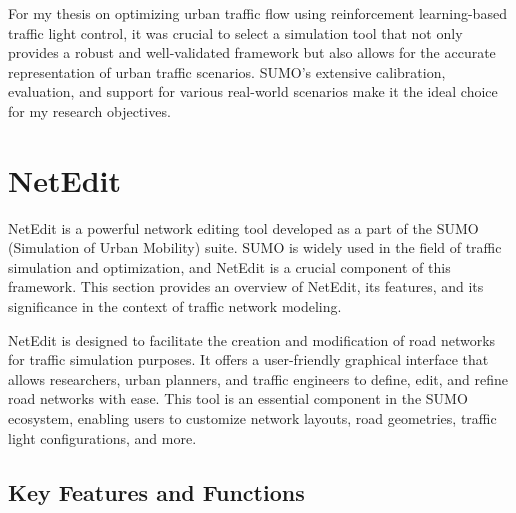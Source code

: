 For my thesis on optimizing urban traffic flow using reinforcement learning-based traffic light control, it was crucial to select a simulation tool that not only provides a robust and well-validated framework but also allows for the accurate representation of urban traffic scenarios. SUMO's extensive calibration, evaluation, and support for various real-world scenarios make it the ideal choice for my research objectives.

\section{NetEdit}
NetEdit is a powerful network editing tool developed as a part of the SUMO (Simulation of Urban Mobility)\cite{SUMO2018} suite. SUMO is widely used in the field of traffic simulation and optimization, and NetEdit is a crucial component of this framework. This section provides an overview of NetEdit, its features, and its significance in the context of traffic network modeling.

NetEdit is designed to facilitate the creation and modification of road networks for traffic simulation purposes. It offers a user-friendly graphical interface that allows researchers, urban planners, and traffic engineers to define, edit, and refine road networks with ease. This tool is an essential component in the SUMO ecosystem, enabling users to customize network layouts, road geometries, traffic light configurations, and more.

\subsection{Key Features and Functions}

